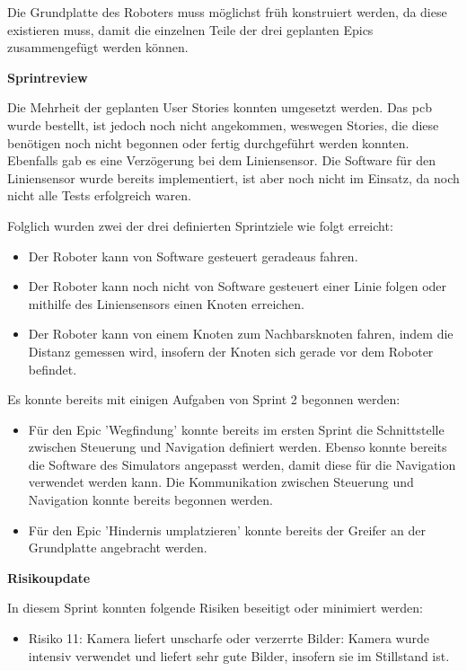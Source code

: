 Die Grundplatte des Roboters muss möglichst früh konstruiert werden, da diese existieren muss, damit die einzelnen Teile der drei geplanten Epics zusammengefügt werden können.


\textbf{Sprintreview}

Die Mehrheit der geplanten User Stories konnten umgesetzt werden.
Das \acrshort{pcb} wurde bestellt, ist jedoch noch nicht angekommen, weswegen Stories, die diese benötigen noch nicht begonnen oder fertig durchgeführt werden konnten.
Ebenfalls gab es eine Verzögerung bei dem Liniensensor. Die Software für den Liniensensor wurde bereits implementiert, ist aber noch nicht im Einsatz, da noch nicht alle Tests erfolgreich waren.

Folglich wurden zwei der drei definierten Sprintziele wie folgt erreicht:
\begin{itemize}
    \item Der Roboter kann von Software gesteuert geradeaus fahren.
    \item Der Roboter kann noch nicht von Software gesteuert einer Linie folgen oder mithilfe des Liniensensors einen Knoten erreichen.
    \item Der Roboter kann von einem Knoten zum Nachbarsknoten fahren, indem die Distanz gemessen wird, insofern der Knoten sich gerade vor dem Roboter befindet.
\end{itemize}


Es konnte bereits mit einigen Aufgaben von Sprint 2 begonnen werden:

\begin{itemize}
    \item Für den Epic 'Wegfindung' konnte bereits im ersten Sprint die Schnittstelle zwischen Steuerung und Navigation definiert werden. Ebenso konnte bereits die Software des Simulators angepasst werden, damit diese für die Navigation verwendet werden kann. Die Kommunikation zwischen Steuerung und Navigation konnte bereits begonnen werden.
    \item Für den Epic 'Hindernis umplatzieren' konnte bereits der Greifer an der Grundplatte angebracht werden.
\end{itemize}



\textbf{Risikoupdate}
\label{risks-sprint-1}

In diesem Sprint konnten folgende Risiken beseitigt oder minimiert werden:
\begin{itemize}
    \item Risiko 11: Kamera liefert unscharfe oder verzerrte Bilder: Kamera wurde intensiv verwendet und liefert sehr gute Bilder, insofern sie im Stillstand ist.
\end{itemize}


